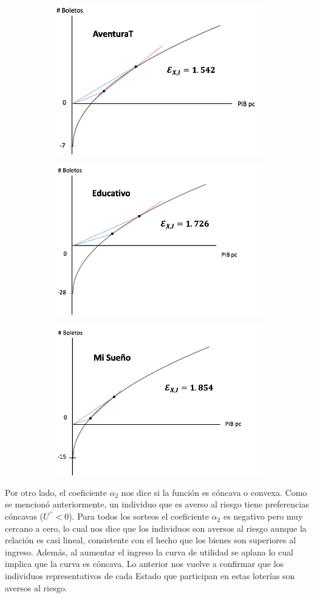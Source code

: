 \begin{figure}[H]
\centering
\caption{Relación \beta_1}
\label{fig:test}
\begin{subfigure}
  \centering
  \includegraphics[width=.45\linewidth]{Imagenes/aven.png}
\end{subfigure}%
\begin{subfigure}
  \centering
  \includegraphics[width=.45\linewidth]{Imagenes/educ.png}
\end{subfigure}
\end{figure}

\begin{figure}[H]
\centering
\begin{subfigure}
  \centering
  \includegraphics[width=.45\linewidth]{Imagenes/suen.png}
\end{subfigure}
\end{figure}

\newpage

Por otro lado, el coeficiente $\alpha_2$ nos dice si la función es cóncava o convexa. Como se mencionó anteriormente, un individuo que es averso al riesgo tiene preferencias cóncavas ($U^{\prime \prime} < 0$). Para todos los sorteos el coeficiente $\alpha_2$ es negativo pero muy cercano a cero, lo cual nos dice que los individuos son aversos al riesgo aunque la relación es casi lineal, consistente con el hecho que los bienes son superiores al ingreso. Además, al aumentar el ingreso la curva de utilidad se aplana lo cual implica que la curva es cóncava. Lo anterior nos vuelve a confirmar que los individuos representativos de cada Estado que participan en estas loterías son aversos al riesgo. \\ %

